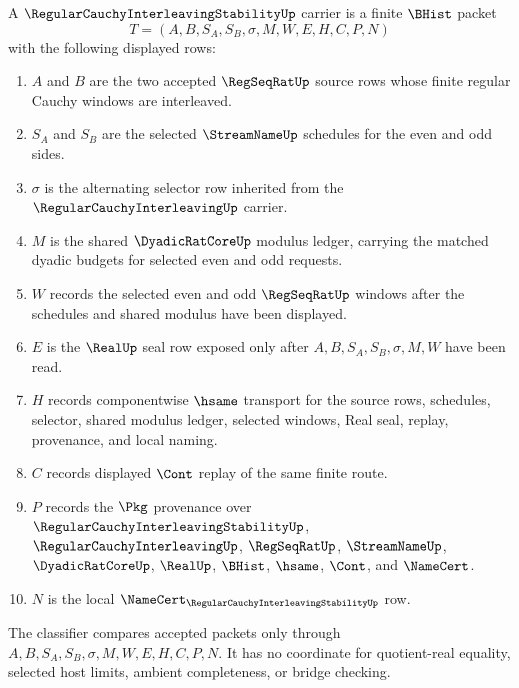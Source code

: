 \begin{definition}
\label{def:regular-cauchy-interleaving-stability-carrier}
A $\RegularCauchyInterleavingStabilityUp$ carrier is a finite $\BHist$ packet
$$
T=(A,B,S_A,S_B,\sigma,M,W,E,H,C,P,N)
$$
with the following displayed rows:
\begin{enumerate}
\item $A$ and $B$ are the two accepted $\RegSeqRatUp$ source rows whose finite regular Cauchy windows are interleaved.
\item $S_A$ and $S_B$ are the selected $\StreamNameUp$ schedules for the even and odd sides.
\item $\sigma$ is the alternating selector row inherited from the $\RegularCauchyInterleavingUp$ carrier.
\item $M$ is the shared $\DyadicRatCoreUp$ modulus ledger, carrying the matched dyadic budgets for selected even and odd requests.
\item $W$ records the selected even and odd $\RegSeqRatUp$ windows after the schedules and shared modulus have been displayed.
\item $E$ is the $\RealUp$ seal row exposed only after $A,B,S_A,S_B,\sigma,M,W$ have been read.
\item $H$ records componentwise $\hsame$ transport for the source rows, schedules, selector, shared modulus ledger, selected windows, Real seal, replay, provenance, and local naming.
\item $C$ records displayed $\Cont$ replay of the same finite route.
\item $P$ records the $\Pkg$ provenance over $\RegularCauchyInterleavingStabilityUp$, $\RegularCauchyInterleavingUp$, $\RegSeqRatUp$, $\StreamNameUp$, $\DyadicRatCoreUp$, $\RealUp$, $\BHist$, $\hsame$, $\Cont$, and $\NameCert$.
\item $N$ is the local $\NameCert_{\RegularCauchyInterleavingStabilityUp}$ row.
\end{enumerate}
The classifier compares accepted packets only through $A,B,S_A,S_B,\sigma,M,W,E,H,C,P,N$. It has no coordinate for quotient-real equality, selected host limits, ambient completeness, or bridge checking.
\end{definition}

